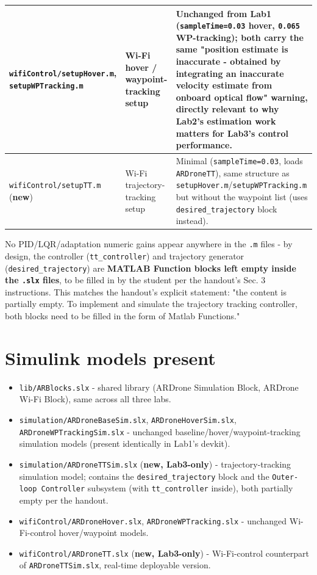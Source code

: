 \documentclass[11pt]{article}
\begin{document}
\begin{center}
\begin{longtable}{|p{3.0cm}|p{4.0cm}|p{7.2cm}|}
\hline
\texttt{wifiControl/\allowbreak{}setupHover.m}, \texttt{setupWPTracking.m} & Wi-Fi hover / waypoint-tracking setup & Unchanged from Lab1 (\texttt{sampleTime=0.03} hover, \texttt{0.065} WP-tracking); both carry the same "position estimate is inaccurate - obtained by integrating an inaccurate velocity estimate from onboard optical flow" warning, directly relevant to why Lab2's estimation work matters for Lab3's control performance. \\
\hline
\texttt{wifiControl/\allowbreak{}setupTT.m} (\textbf{new}) & Wi-Fi trajectory-tracking setup & Minimal (\texttt{sampleTime=0.03}, loads \texttt{ARDroneTT}), same structure as \texttt{setupHover.m}/\texttt{setupWPTracking.m} but without the waypoint list (uses \texttt{desired\_\allowbreak{}trajectory} block instead). \\
\hline
\end{longtable}
\end{center}

No PID/LQR/adaptation numeric gains appear anywhere in the \texttt{.m} files - by design, the controller (\texttt{tt\_\allowbreak{}controller}) and trajectory generator (\texttt{desired\_\allowbreak{}trajectory}) are \textbf{MATLAB Function blocks left empty inside the \texttt{.slx} files}, to be filled in by the student per the handout's Sec. 3 instructions. This matches the handout's explicit statement: "the content is partially empty. To implement and simulate the trajectory tracking controller, both blocks need to be filled in the form of Matlab Functions."

\section{Simulink models present}

\begin{itemize}
\item \texttt{lib/ARBlocks.slx} - shared library (ARDrone Simulation Block, ARDrone Wi-Fi Block), same across all three labs.
\item \texttt{simulation/\allowbreak{}ARDroneBaseSim.slx}, \texttt{ARDroneHoverSim.slx}, \texttt{ARDroneWPTrackingSim.slx} - unchanged baseline/hover/waypoint-tracking simulation models (present identically in Lab1's devkit).
\item \texttt{simulation/\allowbreak{}ARDroneTTSim.slx} (\textbf{new, Lab3-only}) - trajectory-tracking simulation model; contains the \texttt{desired\_\allowbreak{}trajectory} block and the \texttt{Outer-loop Controller} subsystem (with \texttt{tt\_\allowbreak{}controller} inside), both partially empty per the handout.
\item \texttt{wifiControl/\allowbreak{}ARDroneHover.slx}, \texttt{ARDroneWPTracking.slx} - unchanged Wi-Fi-control hover/waypoint models.
\item \texttt{wifiControl/\allowbreak{}ARDroneTT.slx} (\textbf{new, Lab3-only}) - Wi-Fi-control counterpart of \texttt{ARDroneTTSim.slx}, real-time deployable version.
\end{itemize}
\end{document}

